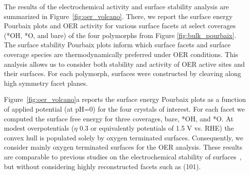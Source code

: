 %
%
The results of the electrochemical activity and surface stability analysis are summarized in Figure~\ref{fig:oer_volcano}.
%
There, we report the surface energy Pourbaix plots and OER activity for various surface facets at select coverages (*OH, *O, and bare) of the four \IrOx polymorphs from Figure \ref{fig:bulk_pourbaix}.
%
The surface stability Pourbaix plots inform which surface facets and surface coverage species are thermodynamically preferred under OER conditions.
%
This analysis allows us to consider both stability and activity of OER active sites and their surfaces.
%
For each polymorph, surfaces were constructed by cleaving along high symmetry facet planes.


%
%
Figure~\ref{fig:oer_volcano}a reports the surface energy Pourbaix plots as a function of applied potential (at pH\num{=0}) for the four \IrOx crystals of interest.
%
For each facet we computed the surface free energy for three coverages, bare, *OH, and *O.
%
At modest overpotentials ($\eta$ \mytilde\num{0.3} or equivalently potentials of \mytilde\num{1.5} V vs. RHE) the convex hull is populated solely by oxygen terminated surfaces.
%
Consequently, we consider mainly oxygen terminated surfaces for the OER analysis.
%
These results are comparable to previous studies on the electrochemical stability of \IrOtwo surfaces~\cite{Nattino2019},
but without considering highly reconstructed facets such as (101).


